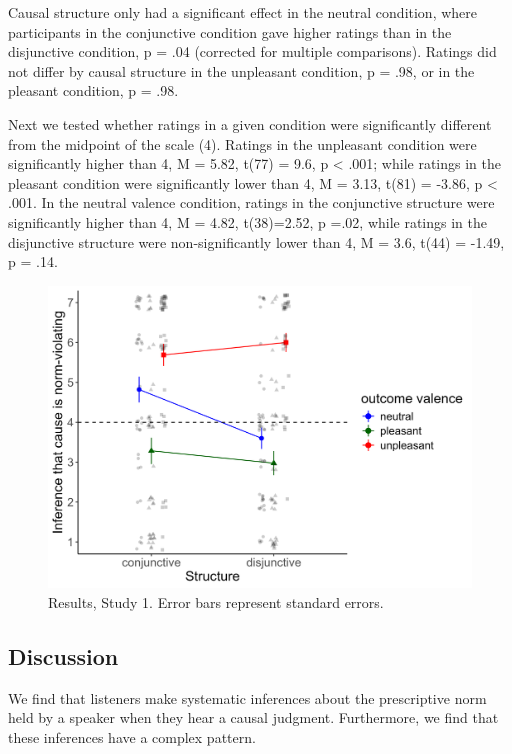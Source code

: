 \documentclass[fleqn,reqno,10pt]{article}
\begin{document}
Causal structure only had a significant effect in the neutral condition, where participants in the conjunctive condition gave higher ratings than in the disjunctive condition, p = .04 (corrected for multiple comparisons). Ratings did not differ by causal structure in the unpleasant condition, p = .98, or in the pleasant condition, p = .98.

Next we tested whether ratings in a given condition were significantly different from the midpoint of the scale (4). Ratings in the unpleasant condition were significantly higher than 4, M = 5.82, t(77) = 9.6, p < .001; while ratings in the pleasant condition were significantly lower than 4, M = 3.13, t(81) = -3.86, p < .001. In the neutral valence condition, ratings in the conjunctive structure were significantly higher than 4, M = 4.82, t(38)=2.52, p =.02, while ratings in the disjunctive structure were non-significantly lower than 4, M = 3.6, t(44) = -1.49, p = .14.





\begin{figure}[ht]
\begin{center}
\includegraphics[scale=.5]{ResultsStudy1.png}
\end{center}
\caption{Results, Study 1. Error bars represent standard errors.}
\label{fig:resultsStudy1}
\end{figure}


\subsection{Discussion}
We find that listeners make systematic inferences about the prescriptive norm held by a speaker when they hear a causal judgment. Furthermore, we find that these inferences have a complex pattern.
\end{document}
